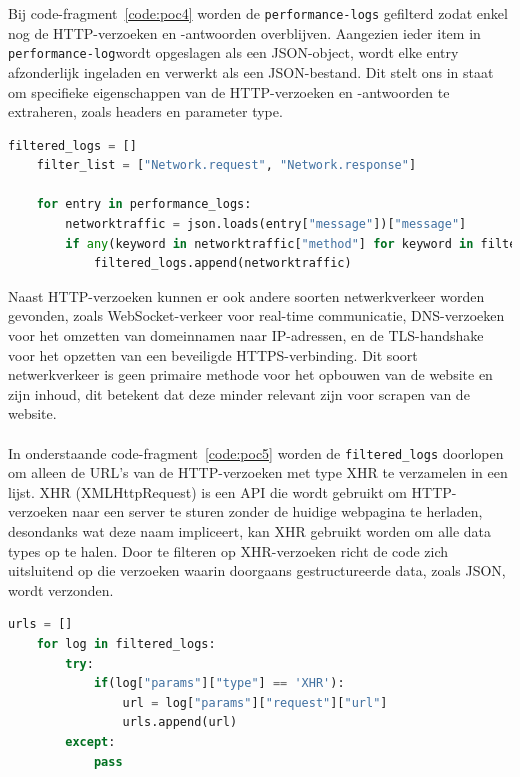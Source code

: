 Bij code-fragment~\ref{code:poc4} worden de \texttt{performance-logs} gefilterd zodat enkel nog de HTTP-verzoeken en -antwoorden overblijven. Aangezien ieder item in \texttt{performance-log}wordt opgeslagen als een JSON-object, wordt elke entry afzonderlijk ingeladen en verwerkt als een JSON-bestand. Dit stelt ons in staat om specifieke eigenschappen van de HTTP-verzoeken en -antwoorden te extraheren, zoals headers en parameter type.

\begin{lstlisting}[language=python, captionpos=b, caption={Filteren van performance-logs }, label={code:poc4}]
    filtered_logs = []
    filter_list = ["Network.request", "Network.response"]

    for entry in performance_logs:
        networktraffic = json.loads(entry["message"])["message"]
        if any(keyword in networktraffic["method"] for keyword in filter_list):
            filtered_logs.append(networktraffic)
\end{lstlisting}
Naast HTTP-verzoeken kunnen er ook andere soorten netwerkverkeer worden gevonden, zoals WebSocket-verkeer voor real-time communicatie, DNS-verzoeken voor het omzetten van domeinnamen naar IP-adressen, en de TLS-handshake voor het opzetten van een beveiligde HTTPS-verbinding. Dit soort netwerkverkeer is geen primaire methode voor het opbouwen van de website en zijn inhoud, dit betekent dat deze minder relevant zijn voor scrapen van de website.
\\ \\
In onderstaande code-fragment~\ref{code:poc5}  worden de \texttt{filtered\_logs} doorlopen om alleen de URL's van de HTTP-verzoeken met type XHR te verzamelen in een lijst. XHR (XMLHttpRequest) is een API die wordt gebruikt om HTTP-verzoeken naar een server te sturen zonder de huidige webpagina te herladen, desondanks wat deze naam impliceert, kan XHR gebruikt worden om alle data types op te halen. Door te filteren op XHR-verzoeken richt de code zich uitsluitend op die verzoeken waarin doorgaans gestructureerde data, zoals JSON, wordt verzonden.

\begin{lstlisting}[language=python, captionpos=b, caption={De URL's uit de HTTP-verzoeken halen}, label={code:poc5},]
    urls = []
    for log in filtered_logs:
        try:
            if(log["params"]["type"] == 'XHR'):
                url = log["params"]["request"]["url"]
                urls.append(url)
        except:
            pass
\end{lstlisting}


